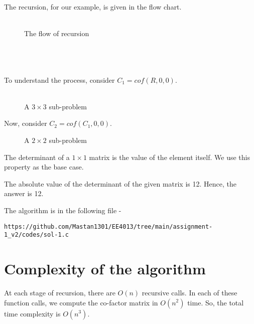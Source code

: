 \documentclass[journal,12pt,twocolumn]{IEEEtran}
\begin{document}
The recursion, for our example, is given in the flow chart. \\ \\

\begin{figure}[h!]
	\begin{center}
		\resizebox{\columnwidth/1}{!}{}
	\end{center}
	\caption{The flow of recursion}
	\label{fig:fig1}
\end{figure}

\\ \\ \\ To understand the process, consider $C_1 = cof(R, 0, 0)$. \\ \\

\begin{figure}[h!]
	\begin{center}
		\resizebox{\columnwidth/1}{!}{}
	\end{center}
	\caption{A $3 \times 3$ sub-problem}
	\label{fig:fig2}
\end{figure}

Now, consider $C_2 = cof(C_1, 0, 0)$. 

\begin{figure}[h!]
	\begin{center}
		\resizebox{\columnwidth/1}{!}{}
	\end{center}
	\caption{A $2 \times 2$ sub-problem}
	\label{fig:fig3}
\end{figure}

The determinant of a $1 \times 1$ matrix is the value of the element itself. We use this property as the base case.

The absolute value of the determinant of the given matrix is 12. Hence, the answer is 12.

The algorithm is in the following file - 
\begin{lstlisting}
https://github.com/Mastan1301/EE4013/tree/main/assignment-1_v2/codes/sol-1.c
\end{lstlisting}

\section{Complexity of the algorithm}
At each stage of recursion, there are $O(n)$ recursive calls. In each of these function calls, we compute the co-factor matrix in $O(n ^ 2)$ time. So, the total time complexity is $O(n ^ 3)$.
\end{document}
